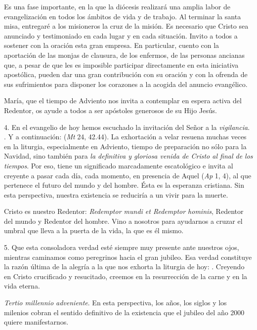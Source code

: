 \begin{body}
Es una fase importante, en la que la diócesis realizará una amplia labor de evangelización en todos los ámbitos de vida y de trabajo. Al terminar la santa misa, entregaré a los misioneros la cruz de la misión. Es necesario que Cristo sea anunciado y testimoniado en cada lugar y en cada situación. Invito a todos a sostener con la oración esta gran empresa. En particular, cuento con la aportación de las monjas de clausura, de los enfermos, de las personas ancianas que, a pesar de que les es imposible participar directamente en esta iniciativa apostólica, pueden dar una gran contribución con su oración y con la ofrenda de sus sufrimientos para disponer los corazones a la acogida del anuncio evangélico.

María, que el tiempo de Adviento nos invita a contemplar en espera activa del Redentor, os ayude a todos a ser apóstoles generosos de su Hijo Jesús.

4. En el evangelio de hoy hemos escuchado la invitación del Señor a la \emph{vigilancia}. . Y a continuación:  (\emph{Mt} 24, 42.44). La exhortación a velar resuena muchas veces en la liturgia, especialmente en Adviento, tiempo de preparación no sólo para la Navidad, sino también para \emph{la definitiva y gloriosa venida de Cristo al final de los tiempos}. Por eso, tiene un significado marcadamente escatológico e invita al creyente a pasar cada día, cada momento, en presencia de Aquel  (\emph{Ap} 1, 4), al que pertenece el futuro del mundo y del hombre. Ésta es la esperanza cristiana. Sin esta perspectiva, nuestra existencia se reduciría a un vivir para la muerte.

Cristo es nuestro Redentor: \emph{Redemptor mundi et Redemptor hominis}, Redentor del mundo y Redentor del hombre. Vino a nosotros para ayudarnos a cruzar el umbral que lleva a la puerta de la vida, la  que es él mismo.

5. Que esta consoladora verdad esté siempre muy presente ante nuestros ojos, mientras caminamos como peregrinos hacia el gran jubileo. Esa verdad constituye la razón última de la alegría a la que nos exhorta la liturgia de hoy: . Creyendo en Cristo crucificado y resucitado, creemos en la resurrección de la carne y en la vida eterna.

\emph{Tertio millennio adveniente}. En esta perspectiva, los años, los siglos y los milenios cobran el sentido definitivo de la existencia que el jubileo del año 2000 quiere manifestarnos.


\end{body}
